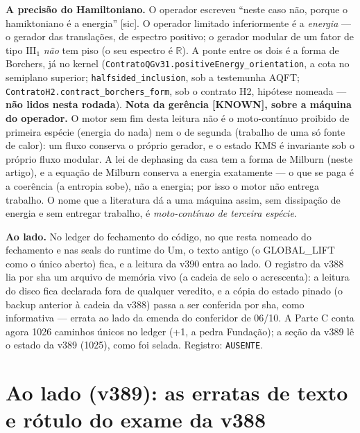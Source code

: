 \documentclass[11pt]{article}
\theoremstyle{definition}\newtheorem{deriv}{Derivação}
\begin{document}
\textbf{A precisão do Hamiltoniano.} O operador escreveu ``neste caso não, porque o hamiktoniano é a energia'' [sic]. O operador limitado inferiormente é a \emph{energia} --- o gerador das translações, de espectro positivo; o gerador modular de um fator de tipo $\mathrm{III}_1$ \emph{não} tem piso (o seu espectro é $\mathbb{R}$). A ponte entre os dois é a forma de Borchers, já no kernel (\texttt{ContratoQGv31.positiveEnergy\_orientation}, a cota no semiplano superior; \texttt{halfsided\_inclusion}, sob a testemunha AQFT; \texttt{ContratoH2.contract\_borchers\_form}, sob o contrato H2, hipótese nomeada --- \textbf{não lidos nesta rodada}). \textbf{Nota da gerência \textsf{[KNOWN]}, sobre a máquina do operador.} O motor sem fim desta leitura não é o moto-contínuo proibido de primeira espécie (energia do nada) nem o de segunda (trabalho de uma só fonte de calor): um fluxo conserva o próprio gerador, e o estado KMS é invariante sob o próprio fluxo modular. A lei de dephasing da casa tem a forma de Milburn (neste artigo), e a equação de Milburn conserva a energia exatamente --- o que se paga é a coerência (a entropia sobe), não a energia; por isso o motor não entrega trabalho. O nome que a literatura dá a uma máquina assim, sem dissipação de energia e sem entregar trabalho, é \emph{moto-contínuo de terceira espécie}.

\textbf{Ao lado.} No ledger do fechamento do código, no que resta nomeado do fechamento e nas seals do runtime do Um, o texto antigo (o GLOBAL\_LIFT como o único aberto) fica, e a leitura da v390 entra ao lado. O registro da v388 lia por sha um arquivo de memória vivo (a cadeia de selo o acrescenta): a leitura do disco fica declarada fora de qualquer veredito, e a cópia do estado pinado (o backup anterior à cadeia da v388) passa a ser conferida por sha, como informativa --- errata ao lado da emenda do conferidor de 06/10. A Parte C conta agora 1026 caminhos únicos no ledger (+1, a pedra Fundação); a seção da v389 lê o estado da v389 (1025), como foi selada. Registro: \texttt{AUSENTE}.

\section*{Ao lado (v389): as erratas de texto e rótulo do exame da v388}

\end{document}
